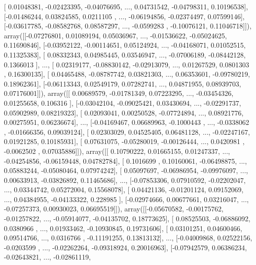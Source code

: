 \documentclass{article}
\begin{document}
       [ 0.01048381, -0.02423395, -0.04076695, ...,  0.04731542,
        -0.04798311,  0.10196538],
       [-0.01486244,  0.03824585,  0.0211105 , ..., -0.06194856,
        -0.02374497,  0.07599146],
       [-0.03617785, -0.08582768,  0.08587297, ..., -0.0599283 ,
        -0.10076121,  0.11046718]]), array([[-0.07276801,  0.01089194,  0.05036967, ..., -0.01536622,
        -0.05024625,  0.11690846],
       [-0.03952122, -0.00114651,  0.05124924, ..., -0.04168071,
         0.01052515,  0.11325383],
       [ 0.08332343,  0.04985445,  0.03546947, ..., -0.07006189,
        -0.08442128,  0.1366013 ],
       ..., 
       [ 0.02319177, -0.08830142, -0.02913079, ...,  0.01267529,
         0.0801303 ,  0.16300135],
       [ 0.04465488, -0.08787742,  0.03821303, ...,  0.06353601,
        -0.09780219,  0.18962361],
       [-0.06113343,  0.02549179,  0.07282741, ...,  0.04871955,
         0.08939703,  0.07176001]]), array([[ 0.00689579, -0.01781349,  0.07223295, ..., -0.03454326,
         0.01255658,  0.106316  ],
       [-0.03042104, -0.09025421,  0.03430694, ..., -0.02291737,
         0.05902989,  0.08219323],
       [ 0.02093041,  0.00250528, -0.07724894, ...,  0.08921776,
         0.00275951,  0.06236674],
       ..., 
       [-0.04169467,  0.06689963, -0.1000443 , ..., -0.0338062 ,
        -0.01666356,  0.09039124],
       [ 0.02303029,  0.04525405,  0.06481128, ..., -0.02247167,
         0.01921285,  0.10185931],
       [ 0.07631075, -0.05280019, -0.00126444, ...,  0.0420981 ,
        -0.0062502 ,  0.07035886]]), array([[ 0.10790222,  0.01665155,  0.01247337, ..., -0.04254856,
        -0.06159448,  0.04782784],
       [ 0.1016699 ,  0.10160061, -0.06498875, ...,  0.05883244,
        -0.05080464,  0.07974242],
       [ 0.05097697, -0.06986954, -0.09976097, ...,  0.00633913,
        -0.03826892,  0.11465686],
       ..., 
       [-0.07853306,  0.07910592, -0.02202047, ...,  0.03344742,
         0.05272004,  0.15568078],
       [ 0.04421136, -0.01201124,  0.09152069, ...,  0.04384955,
        -0.04133322,  0.228985  ],
       [-0.02974666,  0.00677661,  0.03216047, ..., -0.07257373,
         0.00930023,  0.06695519]]), array([[-0.05670582, -0.00175762, -0.01257822, ..., -0.05914077,
        -0.04135702,  0.18773625],
       [ 0.08525503, -0.06886092,  0.0380966 , ...,  0.01933462,
        -0.10930845,  0.19731606],
       [ 0.03101251,  0.04600466,  0.09514766, ...,  0.0316766 ,
        -0.11191255,  0.13813132],
       ..., 
       [-0.04009868,  0.02522156, -0.0203599 , ..., -0.02262264,
        -0.09318924,  0.20016963],
       [-0.07942579,  0.06386234, -0.02643821, ..., -0.02861119,
\end{document}
